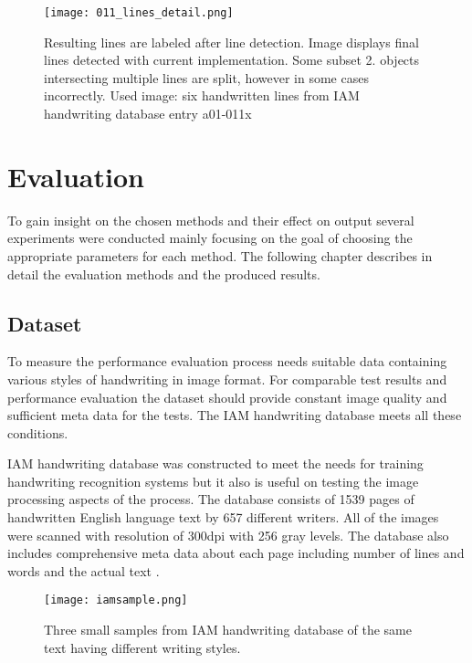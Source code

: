 \documentclass{article}
\begin{document}
            \begin{figure}[!ht]
              \centering
              \texttt{[image: 011\_lines\_detail.png]}
              \caption{Resulting lines are labeled after line detection. Image displays final lines detected with current implementation. Some subset 2. objects intersecting multiple lines are split, however in some cases incorrectly. Used image: six handwritten lines from IAM handwriting database entry a01-011x \label{fig:finallines} }
            \end{figure}

  \newpage
  \section{Evaluation}
    To gain insight on the chosen methods and their effect on output several experiments were conducted mainly focusing on the goal of choosing the appropriate parameters for each method. The following chapter describes in detail the evaluation methods and the produced results.

  \subsection{Dataset}
    To measure the performance evaluation process needs suitable data containing various styles of handwriting in image format. For comparable test results and performance evaluation the dataset should provide constant image quality and sufficient meta data for the tests. The IAM handwriting database meets all these conditions.

    IAM handwriting database was constructed to meet the needs for training handwriting recognition systems but it also is useful on testing the image processing aspects of the process. The database consists of 1539 pages of handwritten English language text by 657 different writers. All of the images were scanned with resolution of 300dpi with 256 gray levels. The database also includes comprehensive meta data about each page including number of lines and words and the actual text \cite{IAM}.

    \begin{figure}[!ht]
      \centering
      \texttt{[image: iamsample.png]}
      \caption{Three small samples from IAM handwriting database of the same text having different writing styles. \label{fig:iamsample} }
    \end{figure}
\end{document}
